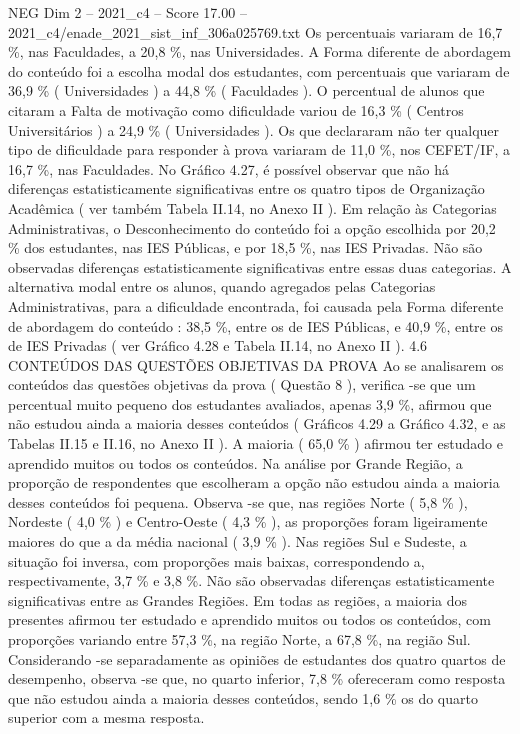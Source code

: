 \begin{textsample}{NEG Dim 2 – 2021\_c4 – Score 17.00 – 2021\_c4/enade\_2021\_sist\_inf\_306a025769.txt}
Os percentuais variaram de 16,7 \%, nas Faculdades, a 20,8 \%, nas Universidades.
A Forma diferente de abordagem do conteúdo foi a escolha modal dos estudantes, com percentuais que variaram de 36,9 \% ( Universidades ) a 44,8 \% ( Faculdades ).
O percentual de alunos que citaram a Falta de motivação como dificuldade variou de 16,3 \% ( Centros Universitários ) a 24,9 \% ( Universidades ).
Os que declararam não ter qualquer tipo de dificuldade para responder à prova variaram de 11,0 \%, nos CEFET/IF, a 16,7 \%, nas Faculdades.
No Gráfico 4.27, é possível observar que não há diferenças estatisticamente significativas entre os quatro tipos de Organização Acadêmica ( ver também Tabela II.14, no Anexo II ).
Em relação às Categorias Administrativas, o Desconhecimento do conteúdo foi a opção escolhida por 20,2 \% dos estudantes, nas IES Públicas, e por 18,5 \%, nas IES Privadas.
Não são observadas diferenças estatisticamente significativas entre essas duas categorias.
A alternativa modal entre os alunos, quando agregados pelas Categorias Administrativas, para a dificuldade encontrada, foi causada pela Forma diferente de abordagem do conteúdo : 38,5 \%, entre os de IES Públicas, e 40,9 \%, entre os de IES Privadas ( ver Gráfico 4.28 e Tabela II.14, no Anexo II ). 4.6 CONTEÚDOS DAS QUESTÕES OBJETIVAS DA PROVA Ao se analisarem os conteúdos das questões objetivas da prova ( Questão 8 ), verifica -se que um percentual muito pequeno dos estudantes avaliados, apenas 3,9 \%, afirmou que não estudou ainda a maioria desses conteúdos ( Gráficos 4.29 a Gráfico 4.32, e as Tabelas II.15 e II.16, no Anexo II ).
A maioria ( 65,0 \% ) afirmou ter estudado e aprendido muitos ou todos os conteúdos.
Na análise por Grande Região, a proporção de respondentes que escolheram a opção não estudou ainda a maioria desses conteúdos foi pequena.
Observa -se que, nas regiões Norte ( 5,8 \% ), Nordeste ( 4,0 \% ) e Centro-Oeste ( 4,3 \% ), as proporções foram ligeiramente maiores do que a da média nacional ( 3,9 \% ).
Nas regiões Sul e Sudeste, a situação foi inversa, com proporções mais baixas, correspondendo a, respectivamente, 3,7 \% e 3,8 \%.
Não são observadas diferenças estatisticamente significativas entre as Grandes Regiões.
Em todas as regiões, a maioria dos presentes afirmou ter estudado e aprendido muitos ou todos os conteúdos, com proporções variando entre 57,3 \%, na região Norte, a 67,8 \%, na região Sul.
Considerando -se separadamente as opiniões de estudantes dos quatro quartos de desempenho, observa -se que, no quarto inferior, 7,8 \% ofereceram como resposta que não estudou ainda a maioria desses conteúdos, sendo 1,6 \% os do quarto superior com a mesma resposta.

\end{textsample}
